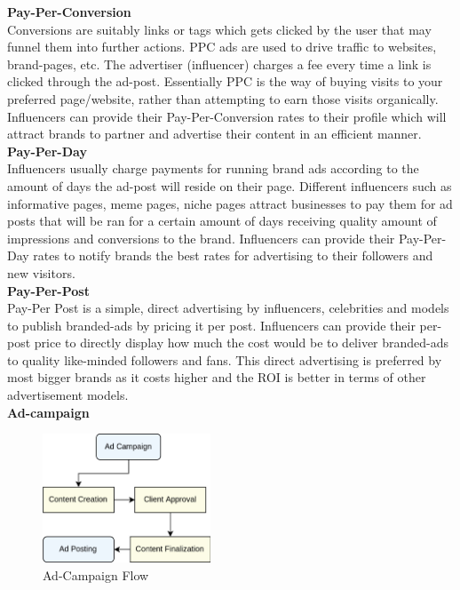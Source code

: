 \documentclass[letterpaper,11pt]{article}
\begin{document}
\textbf{Pay-Per-Conversion}\\

Conversions are suitably links or tags which gets clicked by the user that may funnel them into further actions. PPC ads are used to drive traffic to websites, brand-pages, etc. The advertiser (influencer) charges a fee every time a link is clicked through the ad-post. Essentially PPC is the way of buying visits to your preferred page/website, rather than attempting to earn those visits organically. Influencers can provide their Pay-Per-Conversion rates to their profile which will attract brands to partner and advertise their content in an efficient manner.\\ 

\textbf{Pay-Per-Day}\\

Influencers usually charge payments for running brand ads according to the amount of days the ad-post will reside on their page. Different influencers such as informative pages, meme pages, niche pages attract businesses to pay them for ad posts that will be ran for a certain amount of days receiving quality amount of impressions and conversions to the brand. Influencers can provide their Pay-Per-Day rates to notify brands the best rates for advertising to their followers and new visitors.\\

\textbf{Pay-Per-Post}\\

Pay-Per Post is a simple, direct advertising by influencers, celebrities and models to publish branded-ads by pricing it per post. Influencers can provide their per-post price to directly display how much the cost would be to deliver branded-ads to quality like-minded followers and fans. This direct advertising is preferred by most bigger brands as it costs higher and the ROI is better in terms of other advertisement models.\\

\textbf{Ad-campaign}\\

\begin{figure}[H]
\begin{center}
\includegraphics[width=5cm]{ad-flow}
\caption{Ad-Campaign Flow}
\end{center}
\end{figure}
\end{document}
